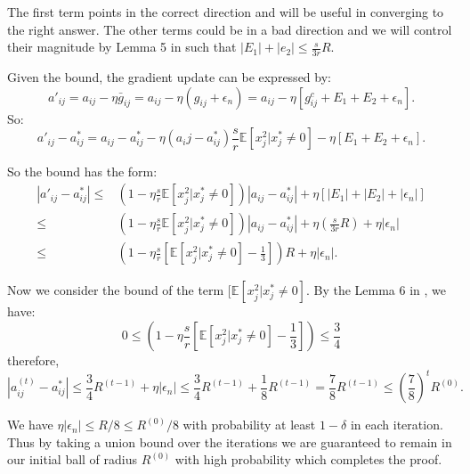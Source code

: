 The first term points in the correct direction and will be useful in converging to the right answer. The other terms could be in a bad direction and we will control their
magnitude by Lemma 5 in \cite{chatterji2017alternating} such that $|E_1|+|e_2|\leq\frac s {3r}R$.

Given the bound, the gradient update can be expressed by:
\begin{equation}
    a'_{ij}=a_{ij}-\eta\bar g_{ij} = a_{ij}-\eta(g_{ij}+\epsilon_n)=a_{ij}-\eta[g_{ij}^c+E_1+E_2+\epsilon_n].
\end{equation}
So:
\begin{equation}
    a'_{ij}-a^*_{ij}=a_{ij}-a^*_{ij}-\eta(a_ij-a^*_{ij})\frac s r \mathbb E[x_j^2|x_j^*\neq0]-\eta[E_1+E_2+\epsilon_n].
\end{equation}

So the bound has the form:
\begin{equation}
\begin{aligned}
|a'_{ij}-a^*_{ij}|\leq&\left(1-\eta\frac s r \mathbb E[x_j^2|x_j^*\neq0]\right)|a_{ij}-a^*_{ij}|+\eta[|E_1|+|E_2|+|\epsilon_n|]\\
\leq&\left(1-\eta\frac s r\mathbb E[x_j^2|x_j^*\neq 0]\right)|a_{ij}-a_{ij}^*|+\eta\left(\frac s {3r} R\right)+\eta|\epsilon_n|\\
\leq&\left(1-\eta\frac s r\left[\mathbb E[x_j^2|x_j^*\neq0]-\frac 1 3\right]\right)R+\eta|\epsilon_n|.
\end{aligned}
\end{equation}

Now we consider the bound of the term $[\mathbb E[x_j^2|x_j^*\neq0]$. By the Lemma 6 in \cite{chatterji2017alternating}, we have:
\begin{equation}
    0\leq\left(1-\eta\frac s r\left[\mathbb E[x_j^2|x_j^*\neq0]-\frac 1 3\right]\right)\leq\frac 3 4
\end{equation}
therefore,
\begin{equation}
|a_{ij}^{(t)}-a_{ij}^*|\leq\frac3 4 R^{(t-1)}+\eta|\epsilon_n|\leq\frac3 4 R^{(t-1)}+\frac1 8 R^{(t-1)}=\frac 7 8R^{(t-1)}\leq\left(\frac 7 8\right)^tR^{(0)}.
\end{equation}

We have $\eta|\epsilon_n|\leq R/8\leq R^{(0)}/8$ with probability at least $1-\delta$ in each iteration. Thus by taking a union bound over the iterations we are guaranteed to remain in our initial ball of radius $R^{(0)}$ with high probability which completes the proof.

